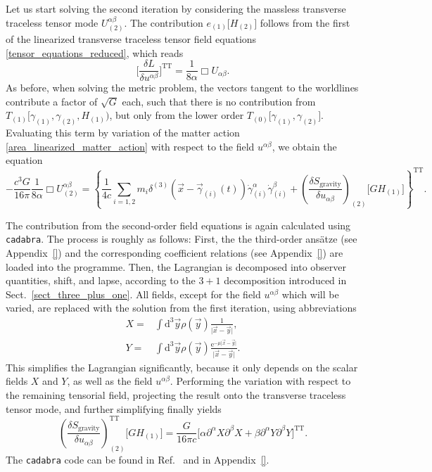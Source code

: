Let us start solving the second iteration by considering the massless transverse traceless tensor mode $U^{\alpha\beta}_{(2)}$. The contribution $e_{(1)}\lbrack H_{(2)}\rbrack$ follows from the first of the linearized transverse traceless tensor field equations \eqref{tensor_equations_reduced}, which reads
\begin{equation}
  \bigg\lbrack\frac{\delta L}{\delta u^{\alpha\beta}}\bigg\rbrack^\text{TT} = \frac{1}{8\alpha} \Box U_{\alpha\beta}.
\end{equation}
As before, when solving the metric problem, the vectors tangent to the worldlines contribute a factor of $\sqrt{G}$ each, such that there is no contribution from $T_{(1)}\lbrack\gamma_{(1)},\gamma_{(2)},H_{(1)})$, but only from the lower order $T_{(0)}\lbrack\gamma_{(1)},\gamma_{(2)}\rbrack$. Evaluating this term by variation of the matter action \eqref{area_linearized_matter_action} with respect to the field $u^{\alpha\beta}$, we obtain the equation
\begin{equation}\label{area_massless_tt_equation}
  -\frac{c^3G}{16\pi} \frac{1}{8\alpha} \Box U^{\alpha\beta}_{(2)} = \left\{\frac{1}{4c}\sum_{i=1,2} m_i \delta^{(3)}(\vec x-\vec\gamma_{(i)}(t))\dot\gamma^\alpha_{(i)}\dot\gamma^\beta_{(i)} + \left(\frac{\delta S_\text{gravity}}{\delta u_{\alpha\beta}}\right)_{(2)}\lbrack GH_{(1)}\rbrack \right\}^\text{TT}.
\end{equation}

The contribution from the second-order field equations is again calculated using \texttt{cadabra}. The process is roughly as follows: First, the the third-order ansätze (see Appendix~\ref{}) and the corresponding coefficient relations (see Appendix~\ref{}) are loaded into the programme. Then, the Lagrangian is decomposed into observer quantities, shift, and lapse, according to the $3+1$ decomposition introduced in Sect.~\ref{sect_three_plus_one}. All fields, except for the field $u^{\alpha\beta}$ which will be varied, are replaced with the solution from the first iteration, using abbreviations
\begin{equation}
  \begin{aligned}
    X = &{} \int\mathrm d^3\vec y\rho(\vec y)\frac{1}{\lvert\vec x-\vec y\rvert}, \\
    Y = &{} \int\mathrm d^3\vec y\rho(\vec y)\frac{\mathrm e^{-\mu\lvert\vec x-\vec y\rvert}}{\lvert\vec x-\vec y\rvert}.
  \end{aligned}
\end{equation}
This simplifies the Lagrangian significantly, because it only depends on the scalar fields $X$ and $Y$, as well as the field $u^{\alpha\beta}$. Performing the variation with respect to the remaining tensorial field, projecting the result onto the transverse traceless tensor mode, and further simplifying finally yields
\begin{equation}
  \left(\frac{\delta S_\text{gravity}}{\delta u_{\alpha\beta}}\right)^\text{TT}_{(2)}\lbrack GH_{(1)}\rbrack = \frac{G}{16\pi c}\lbrack\alpha\partial^\alpha X\partial^\beta X + \beta\partial^\alpha Y\partial^\beta Y\rbrack^\text{TT}.
\end{equation}
The \texttt{cadabra} code can be found in Ref.~\cite{Alex_2020_area-metric-gravity} and in Appendix~\ref{}.

